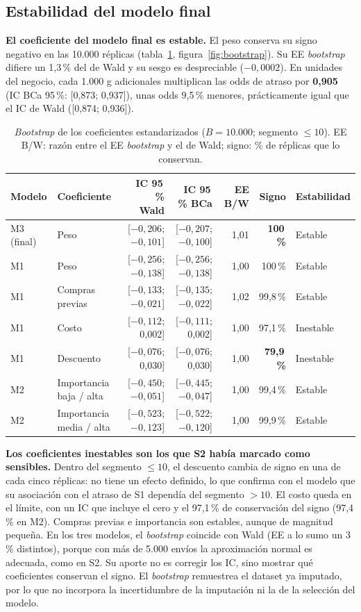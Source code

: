 \documentclass[11pt,a4paper]{article}
\begin{document}
\subsection{Estabilidad del modelo final}\label{sec:result-estabilidad}
\textbf{El coeficiente del modelo final es estable.} El peso conserva su signo negativo en las 10.000 réplicas (tabla~\ref{tab:bootstrap}, figura~\ref{fig:bootstrap}). Su EE \emph{bootstrap} difiere un 1,3\,\% del de Wald y su sesgo es despreciable ($-0{,}0002$). En unidades del negocio, cada 1.000 g adicionales multiplican las odds de atraso por \textbf{0,905} (IC BCa 95\,\%: [0,873; 0,937]), unas odds 9,5\,\% menores, prácticamente igual que el IC de Wald ([0,874; 0,936]).

\begin{table}[!htb]\centering\scriptsize\setlength{\tabcolsep}{3.5pt}
\caption{\emph{Bootstrap} de los coeficientes estandarizados ($B = 10.000$; segmento $\le 10$). EE B/W: razón entre el EE \emph{bootstrap} y el de Wald; signo: \% de réplicas que lo conservan.}\label{tab:bootstrap}
\begin{tabular}{@{}llrrrrl@{}}\toprule
Modelo & Coeficiente & IC 95\,\% Wald & IC 95\,\% BCa & EE B/W & Signo & Estabilidad\\\midrule
M3 (final) & Peso & [$-0{,}206$; $-0{,}101$] & [$-0{,}207$; $-0{,}100$] & 1,01 & \textbf{100\,\%} & Estable\\
M1 & Peso & [$-0{,}256$; $-0{,}138$] & [$-0{,}256$; $-0{,}138$] & 1,00 & 100\,\% & Estable\\
M1 & Compras previas & [$-0{,}133$; $-0{,}021$] & [$-0{,}135$; $-0{,}022$] & 1,02 & 99,8\,\% & Estable\\
M1 & Costo & [$-0{,}112$; 0,002] & [$-0{,}111$; 0,002] & 1,00 & 97,1\,\% & Inestable\\
M1 & Descuento & [$-0{,}076$; 0,030] & [$-0{,}076$; 0,030] & 1,00 & \textbf{79,9\,\%} & Inestable\\
M2 & Importancia baja / alta & [$-0{,}450$; $-0{,}051$] & [$-0{,}445$; $-0{,}047$] & 1,00 & 99,4\,\% & Estable\\
M2 & Importancia media / alta & [$-0{,}523$; $-0{,}123$] & [$-0{,}522$; $-0{,}120$] & 1,00 & 99,9\,\% & Estable\\
\bottomrule\end{tabular}
\end{table}

\textbf{Los coeficientes inestables son los que S2 había marcado como sensibles.} Dentro del segmento $\le 10$, el descuento cambia de signo en una de cada cinco réplicas: no tiene un efecto definido, lo que confirma con el modelo que su asociación con el atraso de S1 dependía del segmento $> 10$. El costo queda en el límite, con un IC que incluye el cero y el 97,1\,\% de conservación del signo (97,4\,\% en M2). Compras previas e importancia son estables, aunque de magnitud pequeña. En los tres modelos, el \emph{bootstrap} coincide con Wald (EE a lo sumo un 3\,\% distintos), porque con más de 5.000 envíos la aproximación normal es adecuada, como en S2. Su aporte no es corregir los IC, sino mostrar qué coeficientes conservan el signo. El \emph{bootstrap} remuestrea el dataset ya imputado, por lo que no incorpora la incertidumbre de la imputación ni la de la selección del modelo.
\end{document}

